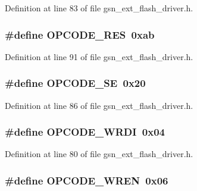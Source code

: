 Definition at line 83 of file gsn\_\-ext\_\-flash\_\-driver.h.

\hypertarget{a00496_a1d08eaf1ec3802e1dabb1fc178c87335}{
\subsubsection[{OPCODE\_\-RES}]{\setlength{\rightskip}{0pt plus 5cm}\#define OPCODE\_\-RES~0xab}}
\label{a00496_a1d08eaf1ec3802e1dabb1fc178c87335}


Definition at line 91 of file gsn\_\-ext\_\-flash\_\-driver.h.

\hypertarget{a00496_aa22f3d73ba8ba4cea869c3526e2557ea}{
\subsubsection[{OPCODE\_\-SE}]{\setlength{\rightskip}{0pt plus 5cm}\#define OPCODE\_\-SE~0x20}}
\label{a00496_aa22f3d73ba8ba4cea869c3526e2557ea}


Definition at line 86 of file gsn\_\-ext\_\-flash\_\-driver.h.

\hypertarget{a00496_a6ae63072814b0a02c13ae656414436dc}{
\subsubsection[{OPCODE\_\-WRDI}]{\setlength{\rightskip}{0pt plus 5cm}\#define OPCODE\_\-WRDI~0x04}}
\label{a00496_a6ae63072814b0a02c13ae656414436dc}


Definition at line 80 of file gsn\_\-ext\_\-flash\_\-driver.h.

\hypertarget{a00496_a2499a677769162b2db9424c0db4c4726}{
\subsubsection[{OPCODE\_\-WREN}]{\setlength{\rightskip}{0pt plus 5cm}\#define OPCODE\_\-WREN~0x06}}
\label{a00496_a2499a677769162b2db9424c0db4c4726}



